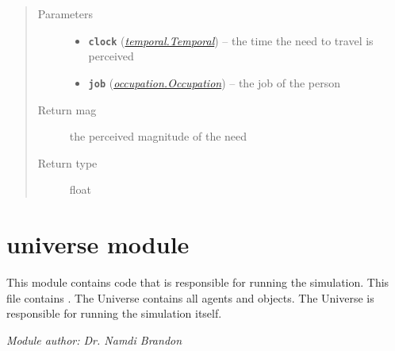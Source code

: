 \documentclass[letterpaper,10pt,english]{sphinxmanual}
\begin{document}
\begin{fulllineitems}
\begin{fulllineitems}
\begin{quote}
\begin{description}
\item[{Parameters}] \leavevmode\begin{itemize}
\item {} 
\textbf{\texttt{clock}} ({\hyperref[temporal:temporal.Temporal]{\emph{\emph{temporal.Temporal}}}}) -- the time the need to travel is perceived

\item {} 
\textbf{\texttt{job}} ({\hyperref[occupation:occupation.Occupation]{\emph{\emph{occupation.Occupation}}}}) -- the job of the person

\end{itemize}

\item[{Return mag}] \leavevmode
the perceived magnitude of the need

\item[{Return type}] \leavevmode
float

\end{description}\end{quote}

\end{fulllineitems}


\end{fulllineitems}



\section{universe module}
\label{universe::doc}\label{universe:universe-module}\label{universe:module-universe}
This module contains code that is responsible for running the simulation. This file contains {\hyperref[universe:universe.Universe]{\emph{}}}. The Universe contains all agents and objects. The Universe is responsible for running the simulation itself.

\emph{Module author: Dr. Namdi Brandon}
\end{document}
